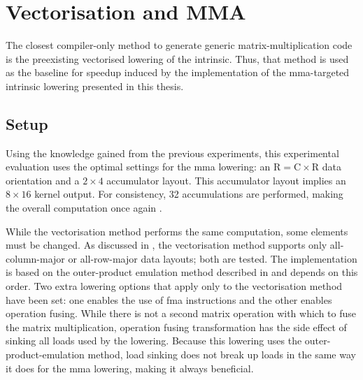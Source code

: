 \documentclass[\main/thesis.tex]{subfiles}
\begin{document}
\section{Vectorisation and MMA}
The closest compiler-only method to generate generic matrix-multiplication code is the preexisting vectorised \gls{lowering} of the  \gls{intrinsic}.
Thus, that method is used as the baseline for speedup induced by the implementation of the \gls{mma}-targeted \gls{intrinsic} \gls{lowering} presented in this thesis.

\subsection{Setup}
Using the knowledge gained from the previous experiments, this experimental evaluation uses the optimal settings for the \gls{mma} \gls{lowering}: an $\textrm{R} = \textrm{C} \times \textrm{R}$ data orientation and a $2 \times 4$ accumulator layout.\footnotemark
{}
This accumulator layout implies an $8 \times 16$ kernel output.
For consistency, 32 accumulations are performed, making the overall computation once again .

While the vectorisation method performs the same computation, some elements must be changed.
As discussed in , the vectorisation method supports only all-column-major or all-row-major data layouts; both are tested.
The implementation is based on the outer-product emulation method described in  and depends on this order.
Two extra \gls{lowering} options that apply only to the vectorisation method have been set: one enables the use of \gls{fma} instructions and the other enables operation fusing.
While there is not a second matrix operation with which to fuse the matrix multiplication, operation fusing transformation has the side effect of sinking all loads used by the \gls{lowering}.
Because this \gls{lowering} uses the outer-product-emulation method, load sinking does not break up loads in the same way it does for the \gls{mma} \gls{lowering}, making it always beneficial.
\end{document}

